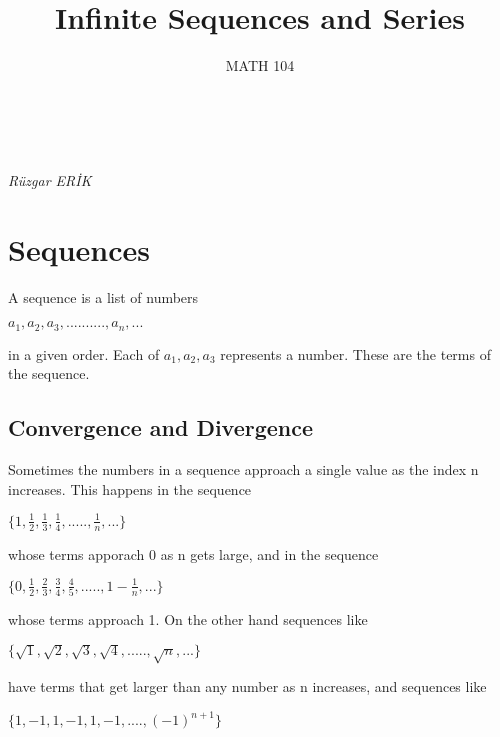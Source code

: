 \documentclass[12pt,a4paper]{article}
\makeatletter
\renewcommand{\maketitle}{%
  \thispagestyle{firstpage} %
  \begin{tcolorbox}[colback=white,colframe=black,width=\textwidth,arc=0mm,auto outer arc]
    \begin{center}
      \Large \@title \\[1ex] \large \@date \\ \textit{Rüzgar ERİK}
    \end{center}
  \end{tcolorbox}
}
\makeatother
\begin{document}
\title{Infinite Sequences and Series}
\date{MATH 104}
\maketitle
\tableofcontents %

\newpage %



\section{Sequences}

A sequence is a list of numbers
 
\begin{center}
$a_{1},a_{2},a_{3},..........,a_{n},...$
\end{center}
in a given order. Each of $a_{1}, a_{2}, a_{3}$ represents a number. These are the terms of the sequence.


\subsection{Convergence and Divergence}

Sometimes the numbers in a sequence approach a single value as the index n increases.
This happens in the sequence 

\begin{center}
$\{1, \frac{1}{2} , \frac{1}{3}, \frac{1}{4}, ..... , \frac{1}{n}, ...\}$
\end{center}

whose terms apporach 0 as n gets large, and in the sequence

\begin{center}
    $\{0, \frac{1}{2}, \frac{2}{3}, \frac{3}{4}, \frac{4}{5}, ....., 1 - \frac{1}{n}, ...\}$
\end{center}

whose terms approach 1. On the other hand sequences like

\begin{center}
    $\{\sqrt{1}, \sqrt{2}, \sqrt{3}, \sqrt{4}, ....., \sqrt{n}, ...\}$
\end{center}

have terms that get larger than any number as n increases, and sequences like

\begin{center}
    $\{1, -1, 1, -1, 1, -1, ...., (-1)^{n+1}\}$
\end{center}
\end{document}
